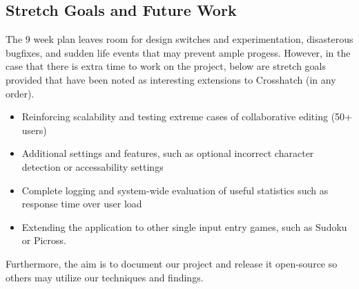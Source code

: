 \documentclass{article}
\begin{document}
\subsection{Stretch Goals and Future Work}
The 9 week plan leaves room for design switches and experimentation, disasterous bugfixes, and sudden life events that
may prevent ample progess. However, in the case that there is extra time to work on the project, below are stretch goals
provided that have been noted as interesting extensions to Crosshatch (in any order).
\begin{itemize}
    \item Reinforcing scalability and testing extreme cases of collaborative editing (50+ users)
    \item Additional settings and features, such as optional incorrect character detection or accessability settings
    \item Complete logging and system-wide evaluation of useful statistics such as response time over user load
    \item Extending the application to other single input entry games, such as Sudoku or Picross.
\end{itemize}

Furthermore, the aim is to document our project and release it open-source so others may utilize our techniques and findings.

\newpage


\end{document}
